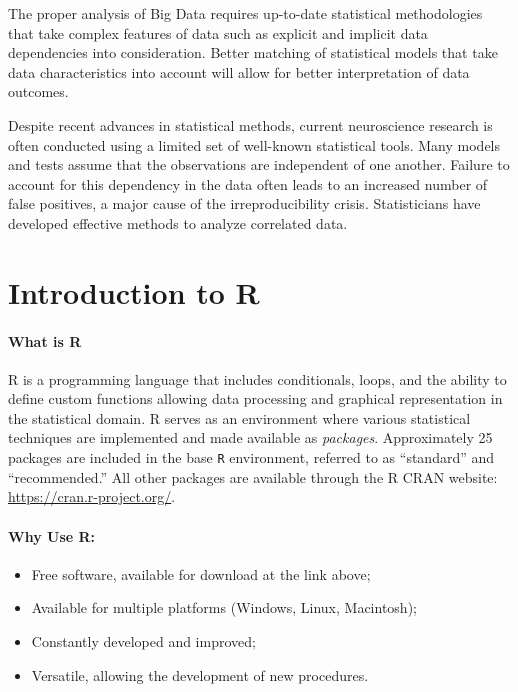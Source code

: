 \documentclass[
]{article}
\providecommand{\tightlist}{%
  \setlength{\itemsep}{0pt}\setlength{\parskip}{0pt}}
\begin{document}
The proper analysis of Big Data requires up-to-date statistical
methodologies that take complex features of data such as explicit and
implicit data dependencies into consideration. Better matching of
statistical models that take data characteristics into account will
allow for better interpretation of data outcomes.

Despite recent advances in statistical methods, current neuroscience
research is often conducted using a limited set of well-known
statistical tools. Many models and tests assume that the observations
are independent of one another. Failure to account for this dependency
in the data often leads to an increased number of false positives, a
major cause of the irreproducibility crisis. Statisticians have
developed effective methods to analyze correlated data.

\hypertarget{introduction-to-r}{%
\section{Introduction to R}\label{introduction-to-r}}

\hypertarget{what-is-r}{%
\paragraph{What is R}\label{what-is-r}}

R is a programming language that includes conditionals, loops, and the
ability to define custom functions allowing data processing and
graphical representation in the statistical domain. R serves as an
environment where various statistical techniques are implemented and
made available as \emph{packages}. Approximately 25 packages are
included in the base \texttt{R} environment, referred to as ``standard''
and ``recommended.'' All other packages are available through the R CRAN
website: \url{https://cran.r-project.org/}.

\hypertarget{why-use-r}{%
\paragraph{Why Use R:}\label{why-use-r}}

\begin{itemize}
\tightlist
\item
  Free software, available for download at the link above;
\item
  Available for multiple platforms (Windows, Linux, Macintosh);
\item
  Constantly developed and improved;
\item
  Versatile, allowing the development of new procedures.
\end{itemize}
\end{document}
